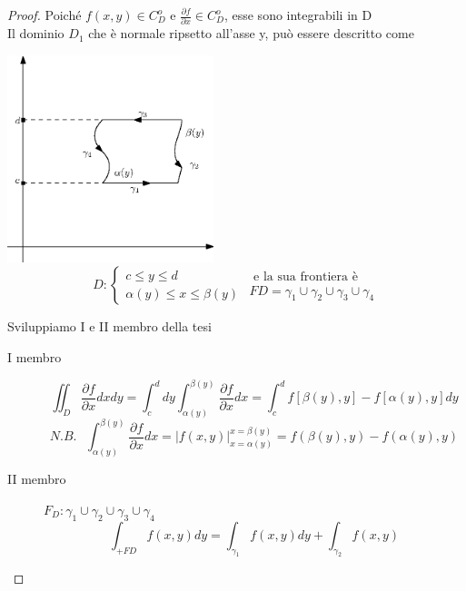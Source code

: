 \begin{proof}
	Poiché $f(x,y)\in C^o_D$ e $\frac{\partial f}{\partial x}\in C^o_D$, esse
	sono integrabili in D\\
	Il dominio $D_1$ che è normale ripsetto all'asse y, può essere descritto
	come 
	\begin{multicols}{2}
		\includegraphics[width=6cm]{img/finiti/primaLeggeGreenGauss.eps}\\
		\begin{equation*}
			D:\begin{cases}
				c\leq y\leq d\\
				\alpha(y) \leq x \leq \beta (y)
			\end{cases} 
			\begin{matrix}
				\text{ e la sua frontiera è }\\ FD=\gamma_1\cup\gamma_2
			\cup \gamma_3 \cup \gamma_4
			\end{matrix}
		\end{equation*}
	\end{multicols}
	Sviluppiamo I e II membro della tesi
	\begin{description}
		\item[I membro] 
			\begin{equation*}
				\iint_{D} \frac{\partial f}{\partial x} dxdy=\int_{c}^{d}
				dy\int_{\alpha(y)}^{\beta(y)}\frac{\partial f}{\partial x} dx=
				\int_{c}^{d} f[\beta(y),y]-f[\alpha(y),y] dy
			\end{equation*}
			\begin{equation*}
				N.B.\text{ } \int_{\alpha (y)}^{\beta (y)} \frac{\partial
				f}{\partial x} dx=\left| f(x,y) \right|^{x=\beta(y)}_{x=\alpha
				(y)}=f(\beta(y),y)-f(\alpha(y), y)
			\end{equation*}
		\item[II membro]
			$F_D: \gamma_1 \cup \gamma_2 \cup \gamma_3 \cup\gamma_4$
			\begin{equation}
				\int_{+FD}f(x,y)dy=\int_{\gamma_1}f(x,y)dy+\int_{\gamma_2}f(x,y)

\end{equation}
\end{description}
\end{proof}
